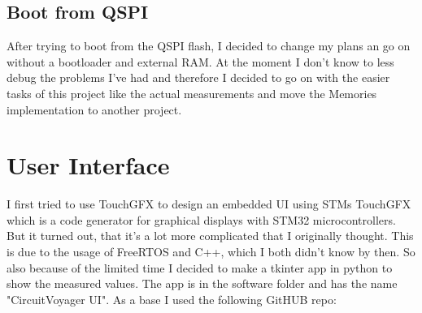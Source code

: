 \subsection{Boot from QSPI}
\label{ssec:bootfromQspi}
After trying to boot from the QSPI flash, I decided to change my plans an go on without a bootloader and external RAM. At the moment I don't know to less debug the problems I've had and therefore I decided to go on with the easier tasks of this project like the actual measurements and move the Memories implementation to another project.



\section{User Interface}
I first tried to use TouchGFX to design an embedded UI using STMs TouchGFX which is a code generator for graphical displays with STM32 microcontrollers. But it turned out, that it's a lot more complicated that I originally thought. This is due to the usage of FreeRTOS and C++, which I both didn't know by then. So also because of the limited time I decided to make a tkinter app in python to show the measured values. The app is in the software folder and has the name "CircuitVoyager UI". As a base I used the following GitHUB repo: \cite{Python_Serial_Port_Tkinter_GUI}